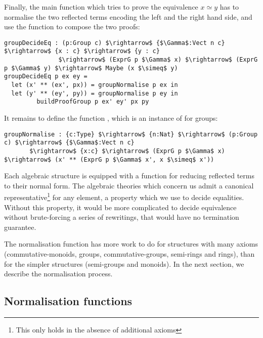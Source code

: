 Finally, the main function which tries to prove the equivalence $x \simeq y$
has to normalise the two reflected terms encoding the left and the right hand
side, and use the function  to compose the two
proofs:

\begin{lstlisting}
groupDecideEq : (p:Group c) $\rightarrow$ {$\Gamma$:Vect n c} $\rightarrow$ {x : c} $\rightarrow$ {y : c} 
               $\rightarrow$ (ExprG p $\Gamma$ x) $\rightarrow$ (ExprG p $\Gamma$ y) $\rightarrow$ Maybe (x $\simeq$ y)
groupDecideEq p ex ey =
  let (x' ** (ex', px)) = groupNormalise p ex in
  let (y' ** (ey', py)) = groupNormalise p ey in
	     buildProofGroup p ex' ey' px py
\end{lstlisting}


It remains to define the function , which is an
instance of  for groups:

\begin{lstlisting}
groupNormalise : {c:Type} $\rightarrow$ {n:Nat} $\rightarrow$ (p:Group c) $\rightarrow$ {$\Gamma$:Vect n c} 
       $\rightarrow$ {x:c} $\rightarrow$ (ExprG p $\Gamma$ x) $\rightarrow$ (x' ** (ExprG p $\Gamma$ x', x $\simeq$ x'))
\end{lstlisting}

Each algebraic structure is equipped with a function for reducing reflected terms to their normal form.
The algebraic theories which concern us admit a canonical representative\footnote{This only holds in the absence of additional axioms}  for
any element, a property which we use to decide equalities. Without this
property, it would be more complicated to decide equivalence without
brute-forcing a series of rewritings, that would have no termination guarantee.  

The normalisation function has more work to do for structures with many
axioms (commutative-monoids, groups, commutative-groups, semi-rings and rings),
than for the simpler structures (semi-groups and monoids). In the next
section, we describe the normalisation process.


\subsection{Normalisation functions}
\label{sect:normalFormShape}

